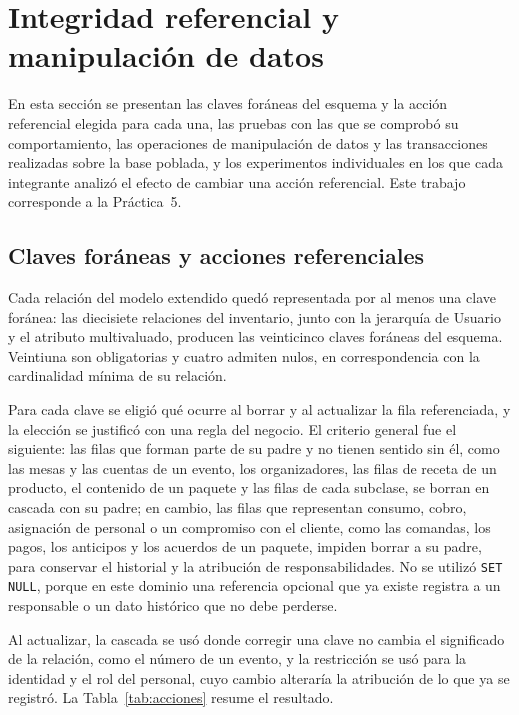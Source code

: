 \newpage

\section{Integridad referencial y manipulación de datos}
\label{sec:integridad}

En esta sección se presentan las claves foráneas del esquema y la acción referencial elegida para cada una, las pruebas con las que se comprobó su comportamiento, las operaciones de manipulación de datos y las transacciones realizadas sobre la base poblada, y los experimentos individuales en los que cada integrante analizó el efecto de cambiar una acción referencial. Este trabajo corresponde a la Práctica~5.

\subsection{Claves foráneas y acciones referenciales}

Cada relación del modelo extendido quedó representada por al menos una clave foránea: las diecisiete relaciones del inventario, junto con la jerarquía de Usuario y el atributo multivaluado, producen las veinticinco claves foráneas del esquema. Veintiuna son obligatorias y cuatro admiten nulos, en correspondencia con la cardinalidad mínima de su relación.

Para cada clave se eligió qué ocurre al borrar y al actualizar la fila referenciada, y la elección se justificó con una regla del negocio. El criterio general fue el siguiente: las filas que forman parte de su padre y no tienen sentido sin él, como las mesas y las cuentas de un evento, los organizadores, las filas de receta de un producto, el contenido de un paquete y las filas de cada subclase, se borran en cascada con su padre; en cambio, las filas que representan consumo, cobro, asignación de personal o un compromiso con el cliente, como las comandas, los pagos, los anticipos y los acuerdos de un paquete, impiden borrar a su padre, para conservar el historial y la atribución de responsabilidades. No se utilizó \texttt{SET NULL}, porque en este dominio una referencia opcional que ya existe registra a un responsable o un dato histórico que no debe perderse.

Al actualizar, la cascada se usó donde corregir una clave no cambia el significado de la relación, como el número de un evento, y la restricción se usó para la identidad y el rol del personal, cuyo cambio alteraría la atribución de lo que ya se registró. La Tabla~\ref{tab:acciones} resume el resultado.

